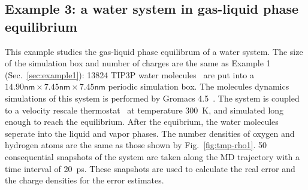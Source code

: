 \documentclass[aps,pre,preprint]{revtex4}
\begin{document}



\subsection{Example 3: a water system in gas-liquid phase equilibrium}
\label{sec:example3}

This example studies the gas-liquid phase equilibrum of a water
system. The size of the simulation box and number of charges are the
same as Example 1 (Sec.~\ref{sec:example1}): 13824 TIP3P water
molecules~\cite{jorgensen1983comparison} are put into a
$14.90\textsf{nm}\times 7.45\textsf{nm}\times 7.45\textsf{nm}$
periodic simulation box.  The molecules dynamics simulations of this
system is performed by Gromacs 4.5~\cite{hess2008gromacs}.  The system
is coupled to a velocity rescale thermostat~\cite{bussi2007canonical}
at temperature 300~\textsf{K}, and simulated long enough to reach the
equilibrium. After the equibrium,
the water molecules seperate into the liquid and vapor phases.
The number densities of oxygen and hydrogen atoms
are the same as those shown by Fig.~\ref{fig:tmp-rho1}.
50 consequential snapshots of
the system are taken along the MD trajectory
with a time interval of 20~\textsf{ps}.  These
snapshots are used to calculate the real error and the charge densities
for the error estimates.
\end{document}
